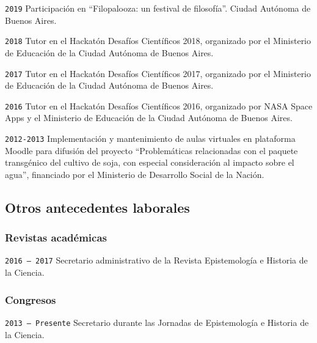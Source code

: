 \documentclass[]{article}
\begin{document}
\texttt{2019} Participación en ``Filopalooza: un festival de
filosofía''. Ciudad Autónoma de Buenos Aires.

\texttt{2018} Tutor en el Hackatón Desafíos Científicos 2018, organizado
por el Ministerio de Educación de la Ciudad Autónoma de Buenos Aires.

\texttt{2017} Tutor en el Hackatón Desafíos Científicos 2017, organizado
por el Ministerio de Educación de la Ciudad Autónoma de Buenos Aires.

\texttt{2016} Tutor en el Hackatón Desafíos Científicos 2016, organizado
por NASA Space Apps y el Ministerio de Educación de la Ciudad Autónoma
de Buenos Aires.

\texttt{2012-2013} Implementación y mantenimiento de aulas virtuales en
plataforma Moodle para difusión del proyecto ``Problemáticas
relacionadas con el paquete transgénico del cultivo de soja, con
especial consideración al impacto sobre el agua'', financiado por el
Ministerio de Desarrollo Social de la Nación.

\hypertarget{otros-antecedentes-laborales}{%
\subsection{Otros antecedentes
laborales}\label{otros-antecedentes-laborales}}

\hypertarget{revistas-acaduxe9micas}{%
\subsubsection{Revistas académicas}\label{revistas-acaduxe9micas}}

\texttt{2016\ –\ 2017} Secretario administrativo de la Revista
Epistemología e Historia de la Ciencia.

\hypertarget{congresos}{%
\subsubsection{Congresos}\label{congresos}}

\texttt{2013\ –\ Presente} Secretario durante las Jornadas de
Epistemología e Historia de la Ciencia.
\end{document}

